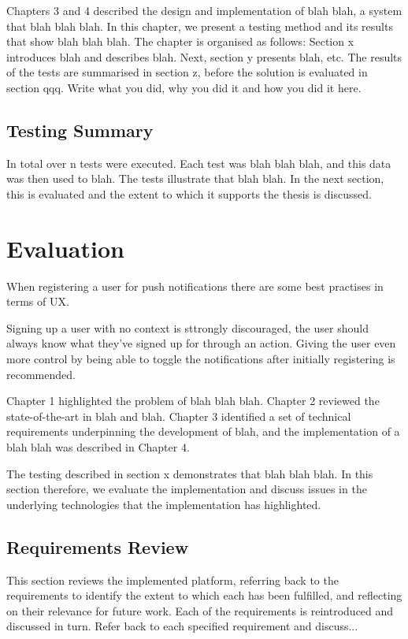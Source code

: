 Chapters 3 and 4 described the design and implementation of blah blah, a system that blah blah blah.  In this chapter, we present a testing method and its results that show blah blah blah.  The chapter is organised as follows:  Section x introduces blah and describes blah.  Next, section y presents blah, etc.
The results of the tests are summarised in section z, before the solution is evaluated in section qqq.
Write what you did, why you did it and how you did it here.

\subsection{Testing Summary}

In total over n tests were executed. Each test was blah blah blah, and this data was then used to blah. The tests illustrate that blah blah. In the next section, this is evaluated and the extent to which it supports the thesis is discussed.

\section{Evaluation}


When registering a user for push notifications there are some best practises in terms of UX.

Signing up a user with no context is sttrongly discouraged, the user should always know what they've signed up for through an action. Giving the user even more control by being able to toggle the notifications after initially registering is recommended. \cite{best_practises_push_notifications}

Chapter 1 highlighted the problem of blah blah blah. Chapter 2 reviewed the state-of-the-art in blah and blah.  Chapter 3 identified a set of technical requirements underpinning the development of blah, and the implementation of a blah blah was described in Chapter 4.

The testing described in section x demonstrates that blah blah blah. In this section therefore, we evaluate the implementation and discuss issues in the underlying technologies that the implementation has highlighted.

    \subsection{Requirements Review} \label{s-i--requirements-review}

    This section reviews the implemented platform, referring back to the requirements to identify the extent to which each has been fulfilled, and reflecting on their relevance for future work. Each of the requirements is reintroduced and discussed in turn.
    Refer back to each specified requirement and discuss...


